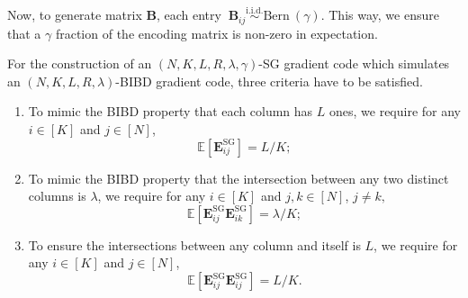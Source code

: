 \documentclass[lettersize,journal]{IEEEtran}
\newcommand{\GSG}{\boldsymbol{E}^{\mathrm{SG}}}
\newcommand{\ex}[1]{\mathbb{E}\left[#1\right]}
\begin{document}
Now, to generate matrix $\boldsymbol{B}$, each entry $~\boldsymbol{B}_{ij}\overset{\mathrm{i.i.d.}}{\sim}\mathrm{Bern}~(\gamma)$. This way, we ensure that a $\gamma$ fraction of the encoding matrix is non-zero in expectation. 

For the construction of an $(N, K, L, R, \lambda, \gamma)$-SG gradient code which simulates an $(N, K, L, R, \lambda)$-BIBD gradient code, three criteria have to be satisfied.
\begin{enumerate}
    \item To mimic the BIBD property that each column has $L$ ones, we require for any $i \in [K]$ and $j \in [N]$,
    \begin{equation}
    \label{row-exp}
        \ex{\GSG_{ij}} = L/K;
    \end{equation}
    \item To mimic the BIBD property that the intersection between any two distinct columns is $\lambda$, we require for any $i\in [K]$ and $j,k \in [N]$, $ j \neq k,$
    \begin{equation}
    \label{diff-intsec-exp}
        \ex{\GSG_{ij}\GSG_{ik}} = \lambda/K;
    \end{equation}
    \item 
    To ensure the intersections between any column and itself is $L$, we require for any $i\in [K]$ and $j \in [N]$,
    \begin{equation}
    \label{same-intsec-exp}
         \ex{\GSG_{ij}\GSG_{ij}} = L/K.
    \end{equation}
\end{enumerate}
\end{document}
